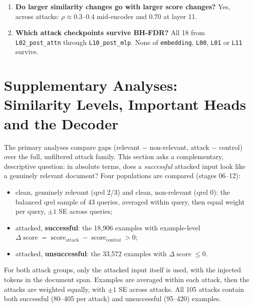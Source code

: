 \documentclass[11pt]{article}
\newcommand{\score}{\operatorname{score}}
\begin{document}
\begin{enumerate}[leftmargin=*]
        middle encoder, and only weakly on average. Overall the trajectories are
        anti-correlated. The minority of score-raising attacks resemble genuine
        relevance more: positive at layer 11, but much smaller.
  \item \textbf{Do larger similarity changes go with larger score changes?} Yes,
        across attacks: $\rho\approx0.3$--$0.4$ mid-encoder and $0.70$ at layer 11.
  \item \textbf{Which attack checkpoints survive BH-FDR?} All 18 from
        \texttt{L02\_post\_attn} through \texttt{L10\_post\_mlp}. None of
        \texttt{embedding}, \texttt{L00}, \texttt{L01} or \texttt{L11} survive.
\end{enumerate}

\section{Supplementary Analyses: Similarity Levels, Important Heads and the Decoder}
\label{sec:supp}

The primary analyses compare gaps (relevant $-$ non-relevant, attack $-$ control) over
the full, unfiltered attack family. This section asks a complementary, descriptive
question: in absolute terms, does a \emph{successful} attacked input look like a genuinely
relevant document? Four populations are compared (stages 06--12):

\begin{itemize}[nosep]
  \item clean, genuinely relevant (qrel 2/3) and clean, non-relevant (qrel 0): the
        balanced qrel sample of 43 queries, averaged within query, then equal weight
        per query, $\pm1$ SE across queries;
  \item attacked, \textbf{successful}: the 18,906 examples with example-level
        $\Delta\score=\score_{\mathrm{attack}}-\score_{\mathrm{control}}>0$;
  \item attacked, \textbf{unsuccessful}: the 33,572 examples with $\Delta\score\le0$.
\end{itemize}

For both attack groups, only the attacked input itself is used, with the injected tokens
in the document span. Examples are averaged within each attack, then the attacks are
weighted equally, with $\pm1$ SE across attacks. All 105 attacks contain both successful
(80--405 per attack) and unsuccessful (95--420) examples.
\end{document}
